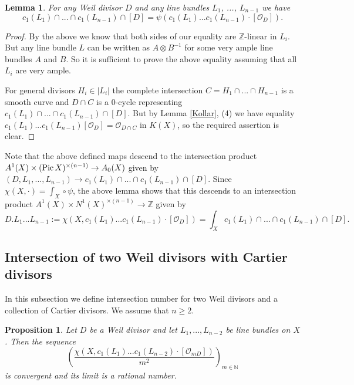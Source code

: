 \documentclass[twoside, 11pt]{article}
\theoremstyle{plain}
\newtheorem{Proposition}[Thm]{\sc Proposition}
\newtheorem{Lemma}[Thm]{\sc Lemma}
\theoremstyle{definition}
\theoremstyle{remark}
\newcommand{\NN}{{\mathbb N}}
\newcommand{\ZZ}{{\mathbb Z}}
\newcommand{\cO}{{\mathcal O}}
\newcommand{\Pic}{{\mathop{\rm Pic \, }}}
\begin{document}
\begin{Lemma}
For any Weil divisor $D$ and any line bundles $L_1$, ..., $L_{n-1}$ we have
$$c_1(L_1)\cap ...\cap c_1(L_{n-1}) \cap [D] = \psi( c_1(L_1)...c_1(L_{n-1}) \cdot [\cO_D]).$$
\end{Lemma}

\begin{proof} By the above we know that both sides of our equality are $\ZZ$-linear in $L_i$.
But any line bundle $L$ can be written as $A\otimes B^{-1}$ for some very ample line bundles $A$ and $B$. So it is sufficient to prove the above equality assuming that all $L_i$ are very ample.

For general divisors $H_i\in |L_i|$ the complete intersection $C=H_1\cap ...\cap H_{n-1}$ is a smooth curve
and $D\cap C$ is a $0$-cycle representing $c_1(L_1)\cap ...\cap c_1(L_{n-1}) \cap [D]$.
But by  Lemma \ref{Kollar}, (4) we have equality  $c_1(L_1)...c_1(L_{n-1})[\cO_D]=\cO _{D\cap C}$ in $K(X)$, so the required assertion is clear.
\end{proof}

Note that the above defined maps descend to the intersection product $A^1(X)\times (\Pic X )^{\times (n-1)}\to A_0(X)$ given by
$(D, L_1,..., L_{n-1})\to  c_1(L_1)\cap ...\cap c_1(L_{n-1}) \cap [D]$. 
Since $\chi (X, \cdot)= \int _X\circ \psi$,  the above lemma  shows that this descends to an intersection product $A^1(X)\times N^1(X)^{\times (n-1)}\to \ZZ$ given by
$$D.L_1...L_{n-1}:= \chi (X, c_1(L_1)...c_1(L_{n-1}) \cdot [\cO_D])= \int_X c_1(L_1)\cap ...\cap c_1(L_{n-1}) \cap [D].$$


\subsection{Intersection of two Weil divisors with Cartier divisors}\label{intersecting-2-Weil}

In this subsection we define intersection number for two Weil divisors and a collection of Cartier divisors.
We assume that $n\ge 2$.

\begin{Proposition}\label{limit-square-of-divisor}
Let $D$ be a Weil divisor and let $L_1,..., L_{n-2}$ be line bundles on $X$.
Then 
the sequence $$\left(\frac {  \chi (X, c_1(L_1)...c_1(L_{n-2}) \cdot [\cO_{mD} ]) }{m^2} \right)_{m\in \NN}$$
 is convergent and its limit is a rational number. 
 \end{Proposition}
\end{document}
